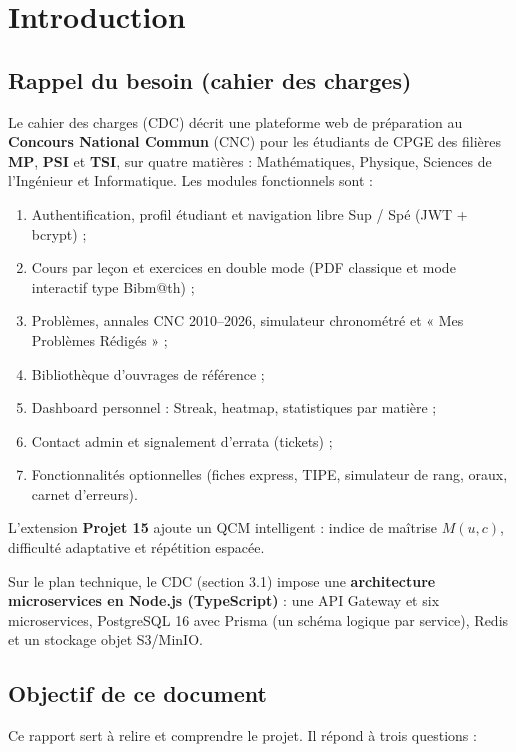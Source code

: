 \section{Introduction}

\subsection{Rappel du besoin (cahier des charges)}

Le cahier des charges (CDC) décrit une plateforme web de préparation au \textbf{Concours National Commun} (CNC) pour les étudiants de CPGE des filières \textbf{MP}, \textbf{PSI} et \textbf{TSI}, sur quatre matières : Mathématiques, Physique, Sciences de l'Ingénieur et Informatique. Les modules fonctionnels sont :

\begin{enumerate}[label=\textbf{M\arabic*}]
  \item Authentification, profil étudiant et navigation libre Sup / Spé (JWT + bcrypt) ;
  \item Cours par leçon et exercices en double mode (PDF classique et mode interactif type Bibm@th) ;
  \item Problèmes, annales CNC 2010–2026, simulateur chronométré et « Mes Problèmes Rédigés » ;
  \item Bibliothèque d'ouvrages de référence ;
  \item Dashboard personnel : Streak, heatmap, statistiques par matière ;
  \item Contact admin et signalement d'errata (tickets) ;
  \item Fonctionnalités optionnelles (fiches express, TIPE, simulateur de rang, oraux, carnet d'erreurs).
\end{enumerate}

L'extension \textbf{Projet 15} ajoute un QCM intelligent : indice de maîtrise $M(u,c)$, difficulté adaptative et répétition espacée.

Sur le plan technique, le CDC (section 3.1) impose une \textbf{architecture microservices en Node.js (TypeScript)} : une API Gateway et six microservices, PostgreSQL 16 avec Prisma (un schéma logique par service), Redis et un stockage objet S3/MinIO.

\subsection{Objectif de ce document}

Ce rapport sert à relire et comprendre le projet. Il répond à trois questions :


